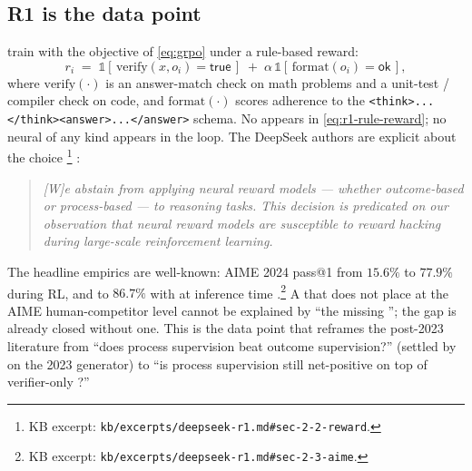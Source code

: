 \subsection{R1 is the data point}
\label{sec:prm-survival-r1}

 train  with the 
objective of \cref{eq:grpo} under a rule-based reward:
\begin{equation}
  r_i \;=\; \mathbb{1}\!\left[\, \mathrm{verify}(x, o_i) = \mathsf{true}\,\right]
  \;+\; \alpha\,\mathbb{1}\!\left[\, \mathrm{format}(o_i) = \mathsf{ok}\,\right],
  \label{eq:r1-rule-reward}
\end{equation}
where $\mathrm{verify}(\cdot)$ is an answer-match check on math
problems and a unit-test / compiler check on code, and
$\mathrm{format}(\cdot)$ scores adherence to the
\verb|<think>...</think><answer>...</answer>| schema. No  appears
in \cref{eq:r1-rule-reward}; no neural  of any kind appears
in the loop. The DeepSeek authors are explicit about the choice%
\footnote{KB excerpt: \nolinkurl{kb/excerpts/deepseek-r1.md#sec-2-2-reward}.}
\citep[\S 2.2]{deepseek-r1}:
\begin{quote}
\itshape
[W]e abstain from applying neural reward models — whether outcome-based
or process-based — to reasoning tasks. This decision is predicated on
our observation that neural reward models are susceptible to reward
hacking during large-scale reinforcement learning.
\end{quote}
The headline empirics are well-known: AIME 2024 pass@1 from
$15.6\%$ to $77.9\%$ during RL, and to $86.7\%$ with 
at inference time \citep[\S 2.3]{deepseek-r1}.\footnote{KB excerpt:
\nolinkurl{kb/excerpts/deepseek-r1.md#sec-2-3-aime}.} A 
that does not place at the AIME human-competitor level cannot be
explained by ``the missing ''; the gap is
already closed without one. This is the data point that
reframes the post-2023  literature from ``does process supervision
beat outcome supervision?'' (settled by \citet{lightman2023-prm800k} on
the 2023 generator) to ``is process supervision still net-positive on
top of verifier-only ?''

